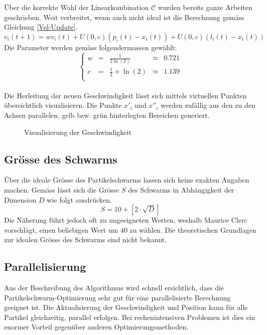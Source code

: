 Über die korrekte Wahl der Linearkombination $\mathcal{C}$ wurden bereits ganze Arbeiten geschrieben. Weit verbreitet, wenn auch nicht ideal ist die Berechnung gemäss Gleichung \ref{Vel-Update}. \\
\begin{equation}
	v_i(t+1) = w v_i(t) + U(0,c) (p_i(t)-x_i(t)) + U(0,c) (l_i(t)-x_i(t))\label{Vel-Update}
\end{equation}
Die Parameter werden gemäss \cite{Clerc-Stagnation} folgendermassen gewählt:
\begin{equation}
	\left\lbrace \begin{array}{lllll}
		w & = & \frac{1}{2 \ln(2)} & \simeq & 0.721 \\
		c & = & \frac{1}{2} + \ln(2) & \simeq & 1.139 \\
	\end{array}	\right. 
\end{equation} \\

Die Herleitung der neuen Geschwindigkeit lässt sich mittels virtuellen Punkten übersichtlich visualisieren. Die Punkte $x'_i$ und $x''_i$ werden zufällig aus den zu den Achsen parallelen, gelb bzw. grün hinterlegten Bereichen generiert.  \\
\begin{figure}[htbp]
	\centering
	
	\caption{Visualisierung der Geschwindigkeit}
	\label{Fig-Visualisierung-Geschwindigkeit}
\end{figure}


\subsection{Grösse des Schwarms}
Über die ideale Grösse des Partikelschwarms lassen sich keine exakten Angaben machen. Gemäss \cite{Clerc-Standards} lässt sich die Grösse $S$ des Schwarms in Abhängigkeit der Dimension $D$ wie folgt ausdrücken.
\begin{equation}
	S = 10 + \left[ 2 \cdot \sqrt{D} \right]
\end{equation}
Die Näherung führt jedoch oft zu ungeeigneten Werten, weshalb Maurice Clerc vorschlägt, einen beliebigen Wert um $40$ zu wählen. Die theoretischen Grundlagen zur idealen Grösse des Schwarms sind nicht bekannt.

\subsection{Parallelisierung}
Aus der Beschreibung des Algorithmus wird schnell ersichtlich, dass die Partikelschwarm-Optimierung sehr gut für eine parallelisierte Berechnung geeignet ist. Die Aktualisierung der Geschwindigkeit und Position kann für alle Partikel gleichzeitig, parallel erfolgen. Bei rechenintensiven Problemen ist dies ein enormer Vorteil gegenüber anderen Optimierungsmethoden.